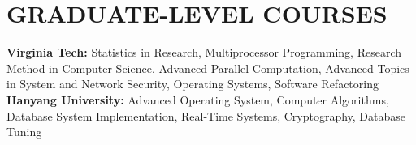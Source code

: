 \section{GRADUATE-LEVEL COURSES}
\vspace{0.03in}
{\bf Virginia Tech:} Statistics in Research, Multiprocessor Programming,
Research Method in Computer Science, Advanced Parallel Computation, Advanced Topics in System
and Network Security, Operating Systems, Software Refactoring\vspace{0.02in}\\
{\bf Hanyang University:} Advanced Operating System, Computer Algorithms,
Database System Implementation, Real-Time Systems,
Cryptography, Database Tuning
